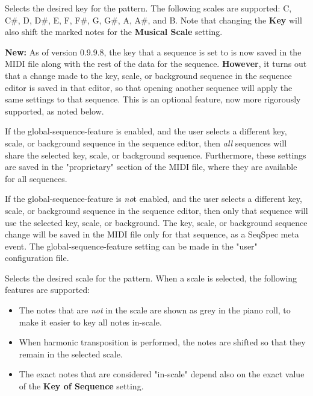    Selects the desired key for the pattern.  The following scales are
   supported:  C, C\#, D, D\#, E, F, F\#, G, G\#, A, A\#, and B.
   Note that changing the \textbf{Key} will also shift the marked notes
   for the \textbf{Musical Scale} setting.

   \textbf{New:}
   As of version 0.9.9.8, the key that a sequence is set to is
   now saved in the MIDI file along with the rest of the data for the sequence.
   \textbf{However},
   it turns out that a change made to the key, scale, or background sequence in
   the sequence editor is saved in that editor, so that opening another sequence
   will apply the same settings to that sequence.  This is an optional feature,
   now more rigorously supported, as noted below.

   If the global-sequence-feature is enabled, and the user selects
   a different key, scale, or background sequence in the sequence editor, 
   then \textsl{all} sequences will share the selected key, scale, or background
   sequence.  Furthermore, these settings are saved in the "proprietary"
   section of the MIDI file, where they are available for all sequences.

   If the global-sequence-feature is \textsl{no}t enabled, and the user selects
   a different key, scale, or background sequence in the sequence editor, 
   then only that sequence will use the selected key, scale, or background.
   The key, scale, or background sequence change will be saved in the MIDI file
   only for that sequence, as a SeqSpec meta event.
   The global-sequence-feature setting can be made in the "user" configuration
   file.

   Selects the desired scale for the pattern.
   When a scale is selected, the following features are supported:

   \begin{itemize}
      \item The notes that are \textsl{not}
         in the scale are shown as grey in the piano
         roll, to make it easier to key all notes in-scale.
      \item When harmonic transposition is performed, the notes are shifted
         so that they remain in the selected scale.
      \item The exact notes that are considered "in-scale" depend also on the 
         exact value of the \textbf{Key of Sequence} setting.
   \end{itemize}

